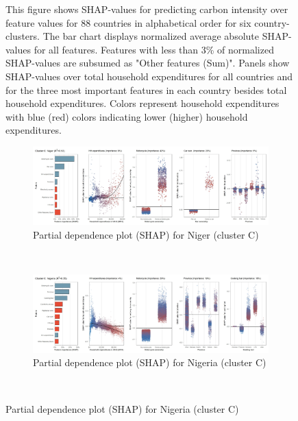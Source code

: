 \begin{figure}[ht!]
    \begin{subcaption2}
     This figure shows SHAP-values for predicting carbon intensity over feature values for 88 countries in alphabetical order for six country-clusters. The bar chart displays normalized average absolute SHAP-values for all features. Features with less than 3\% of normalized SHAP-values are subsumed as "Other features (Sum)". Panels show SHAP-values over total household expenditures for all countries and for the three most important features in each country besides total household expenditures. Colors represent household expenditures with blue (red) colors indicating lower (higher) household expenditures.
     \end{subcaption2}
\end{figure}

\begin{figure}[ht!]\ContinuedFloat
    \centering
   \begin{subfigure}[b]{\textwidth} 
   \centering
         \caption{Partial dependence plot (SHAP) for Niger (cluster C)}
         \label{fig:5b_NER}
         \includegraphics[width=\textwidth]{Figure 5b/Figure_5b_NER}
    \end{subfigure}
    \\
    \vspace{0.5cm}
    \begin{subfigure}[b]{\textwidth}
    \centering
         \caption{Partial dependence plot (SHAP) for Nigeria (cluster C)}
         \label{fig:5b_NGA}
         \includegraphics[width=\textwidth]{Figure 5b/Figure_5b_NGA}    
    \end{subfigure}
    \\

\end{figure}
